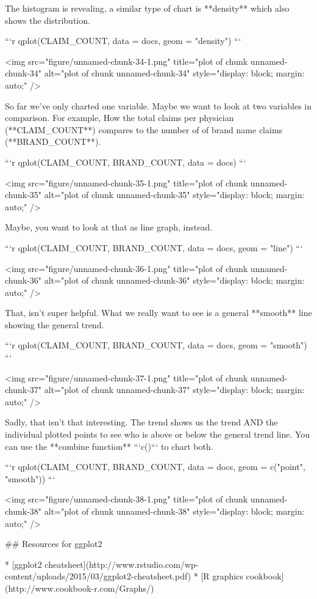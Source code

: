 The histogram is revealing, a similar type of chart is **density** which also shows the distribution.

```r
qplot(CLAIM_COUNT, data = docs, geom = "density")
```

<img src="figure/unnamed-chunk-34-1.png" title="plot of chunk unnamed-chunk-34" alt="plot of chunk unnamed-chunk-34" style="display: block; margin: auto;" />

So far we've only charted one variable. Maybe we want to look at two variables in comparison. For example, How the total claims per physician (**CLAIM_COUNT**) compares to the number of of brand name claims (**BRAND_COUNT**). 


```r
qplot(CLAIM_COUNT, BRAND_COUNT, data = docs)
```

<img src="figure/unnamed-chunk-35-1.png" title="plot of chunk unnamed-chunk-35" alt="plot of chunk unnamed-chunk-35" style="display: block; margin: auto;" />

Maybe, you want to look at that as line graph, instead.


```r
qplot(CLAIM_COUNT, BRAND_COUNT, data = docs, geom = "line")
```

<img src="figure/unnamed-chunk-36-1.png" title="plot of chunk unnamed-chunk-36" alt="plot of chunk unnamed-chunk-36" style="display: block; margin: auto;" />

That, isn't super helpful. What we really want to see is a general **smooth** line showing the general trend. 


```r
qplot(CLAIM_COUNT, BRAND_COUNT, data = docs, geom = "smooth")
```

<img src="figure/unnamed-chunk-37-1.png" title="plot of chunk unnamed-chunk-37" alt="plot of chunk unnamed-chunk-37" style="display: block; margin: auto;" />

Sadly, that isn't that interesting. The trend shows us the trend AND the individual plotted points to see who is above or below the general trend line. You can use the **combine function** ```c()``` to chart both.

```r
qplot(CLAIM_COUNT, BRAND_COUNT, data = docs, geom = c("point", "smooth"))
```

<img src="figure/unnamed-chunk-38-1.png" title="plot of chunk unnamed-chunk-38" alt="plot of chunk unnamed-chunk-38" style="display: block; margin: auto;" />


## Resources for ggplot2

* [ggplot2 cheatsheet](http://www.rstudio.com/wp-content/uploads/2015/03/ggplot2-cheatsheet.pdf)
* [R graphics cookbook](http://www.cookbook-r.com/Graphs/)

